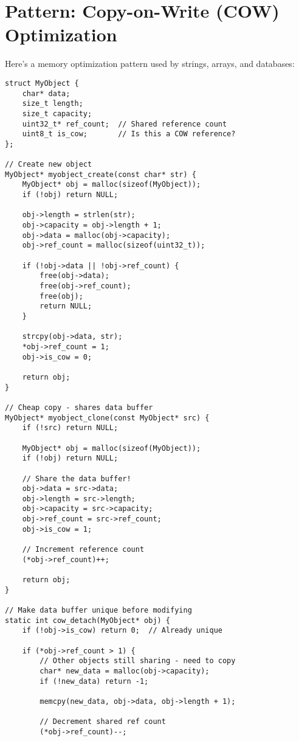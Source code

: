 \section{Pattern: Copy-on-Write (COW) Optimization}

Here's a memory optimization pattern used by strings, arrays, and databases:

\begin{lstlisting}
struct MyObject {
    char* data;
    size_t length;
    size_t capacity;
    uint32_t* ref_count;  // Shared reference count
    uint8_t is_cow;       // Is this a COW reference?
};

// Create new object
MyObject* myobject_create(const char* str) {
    MyObject* obj = malloc(sizeof(MyObject));
    if (!obj) return NULL;

    obj->length = strlen(str);
    obj->capacity = obj->length + 1;
    obj->data = malloc(obj->capacity);
    obj->ref_count = malloc(sizeof(uint32_t));

    if (!obj->data || !obj->ref_count) {
        free(obj->data);
        free(obj->ref_count);
        free(obj);
        return NULL;
    }

    strcpy(obj->data, str);
    *obj->ref_count = 1;
    obj->is_cow = 0;

    return obj;
}

// Cheap copy - shares data buffer
MyObject* myobject_clone(const MyObject* src) {
    if (!src) return NULL;

    MyObject* obj = malloc(sizeof(MyObject));
    if (!obj) return NULL;

    // Share the data buffer!
    obj->data = src->data;
    obj->length = src->length;
    obj->capacity = src->capacity;
    obj->ref_count = src->ref_count;
    obj->is_cow = 1;

    // Increment reference count
    (*obj->ref_count)++;

    return obj;
}

// Make data buffer unique before modifying
static int cow_detach(MyObject* obj) {
    if (!obj->is_cow) return 0;  // Already unique

    if (*obj->ref_count > 1) {
        // Other objects still sharing - need to copy
        char* new_data = malloc(obj->capacity);
        if (!new_data) return -1;

        memcpy(new_data, obj->data, obj->length + 1);

        // Decrement shared ref count
        (*obj->ref_count)--;


\end{lstlisting}
